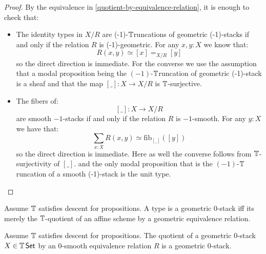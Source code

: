 \documentclass{article}
\newcommand{\truncation}{$\bT$runcation}
\newcommand{\red}[1]{{\color{red} #1}}
\begin{document}
\begin{proof}
By the equivalence in \ref{quotient-by-equivalence-relation}, it is enough to check that:
\begin{itemize}
\item The identity types in $X/R$ are \red{(-1)-\truncation s} of geometric (-1)-stacks if and only if the relation $R$ is (-1)-geometric. For any $x,y:X$ we know that:
\[R(x,y) \simeq [x] =_{X/R}[y]\]
so the direct direction is immediate. For the converse we use the assumption that a modal proposition being the \red{$(-1)$-\truncation} of geometric (-1)-stack is a sheaf and that the map $[\_]:X\to X/R$ is $\mathbb{T}$-surjective.
\item The fibers of: 
\[[\_]:X\to X/R\] 
are smooth $-1$-stacks if and only if the relation $R$ is $-1$-smooth. For any $y:X$ we have that:
\[\sum_{x:X} R(x,y) \simeq \mathrm{fib}_{[\_]}([y])\]
so the direct direction is immediate. Here as well the converse follows from $\mathbb{T}$-surjectivity of $[\_]$. and the only modal proposition that is the \red{$(-1)$-\truncation} of a smooth (-1)-stack is the unit type. 
\end{itemize}
\end{proof}
\begin{corollary}
    Assume $\mathbb{T}$ satisfies descent for propositions.
    A type is a geometric 0-stack iff its merely the $\mathbb{T}$-quotient of an affine scheme by a geometric equivalence relation.
\end{corollary}
\begin{theorem}{\label{thm:QuotientOfAlgebraicSpace}}
    Assume $\mathbb{T}$ satisfies descent for propositions. 
    The quotient of a geometric $0$-stack $X \in \mathbb{T} \operatorname{\mathsf {Set}}$ by an $0$-smooth equivalence relation $R$ is a geometric $0$-stack.
\end{theorem}
\end{document}
